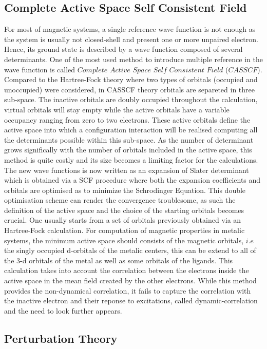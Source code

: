\documentclass{article}
\begin{document}
\subsection{Complete Active Space Self Consistent Field}

For most of magnetic systems, a single reference wave function is not enough as the system is usually not closed-shell and present one or more unpaired electron. Hence, its ground state is described by a wave function composed of several determinants.
One of the most used method to introduce multiple reference in the wave function is called $Complete$ $Active$ $Space$ $Self$ $Consistent$ $Field$ ($CASSCF$). 
Compared to the Hartree-Fock theory where two types of orbitals (occupied and unoccupied) were considered, in CASSCF theory orbitals are separeted in three sub-space. The inactive orbitals are doubly occupied throughout the calculation, virtual orbitals will stay empty while the active orbitals have a variable occupancy ranging from zero to two electrons.
These active orbitals define the active space into which a configuration interaction will be realised computing all the determinants possible within this sub-space. 
As the number of determinant grows significally with the number of orbitals included in the active space, this method is quite costly and its size becomes a limiting factor for the calculations.
The new wave functions is now written as an expansion of Slater determinant which is obtained via a SCF procedure where both the expansion coefficients and orbitals are optimised as to minimize the Schrodinger Equation. 
This double optimisation scheme can render the convergence troublesome, as such the definition of the active space and the choice of the starting orbitals becomes crucial. One usually starts from a set of orbitals previously obtained via an Hartree-Fock calculation.
For computation of magnetic properties in metalic systems, the minimum active space should consists of the magnetic orbitals, $i.e$ the singly occupied d-orbitals of the metalic centers, this can be extend to all of the 3-d orbitals of the metal as well as some orbitals of the ligands.
This calculation takes into account the correlation between the electrons inside the active space in the mean field created by the
other electrons. While this method provides the non-dynamical correlation, it fails to capture the correlation with the inactive electron and their reponse to excitations, called dynamic-correlation and the need to look further appears.


\subsection{Perturbation Theory}
\end{document}
